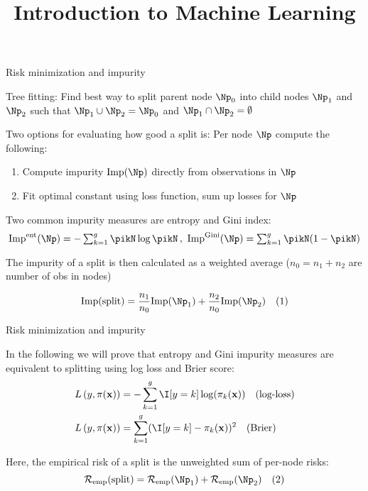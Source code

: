 \documentclass[11pt,compress,t,notes=noshow, xcolor=table]{beamer}
\title{Introduction to Machine Learning}
\begin{document}
    

\begin{framei}[sep=M]{Risk minimization and impurity}

\item Tree fitting: Find best way to split parent node $\Np_0$ into child nodes $\Np_1$ and $\Np_2$ such that $\Np_1 \cup \Np_2 = \Np_0$ and $\Np_1 \cap \Np_2 = \emptyset$
\item Two options for evaluating how good a split is: Per node $\Np$ compute the following:
\begin{enumerate}
\item Compute impurity $\text{Imp}(\Np)$ directly from observations in $\Np$
\item Fit optimal constant using loss function, sum up losses for $\Np$
\end{enumerate}
\item  Two common impurity measures are entropy and Gini index:
$$\text{Imp}^{\text{ent}}(\Np) = -\textstyle\sum_{k = 1}^g \pikN \log \pikN\,,\,\, \text{Imp}^{\text{Gini}}(\Np) = \sum_{k=1}^g \pikN (1-\pikN )$$
\item The impurity of a split is then calculated as a weighted average ($n_0 = n_1 + n_2$ are number of obs in nodes)

$$\text{Imp(split)} = \frac{n_1}{n_0} \text{Imp}(\Np_1) + \frac{n_2}{n_0} \text{Imp}(\Np_2) \quad (1)$$


\end{framei}


\begin{framei}[sep=M]{Risk minimization and impurity}
\item In the following we will prove that entropy and Gini impurity measures are equivalent to splitting using log loss and Brier score:
\begin{align*}
    \Lpixy &= -\sum_{k = 1}^g \I [y=k] \log (\pi_k(\xv)) \quad \text{(log-loss)}\\
    \Lpixy &= \sum_{k = 1}^g (\I [y=k] - \pi_k(\xv))^2 \quad \text{(Brier)}
\end{align*}
\item Here, the empirical risk of a split is the unweighted sum of per-node risks:
$$\riske(\text{split}) = \riske(\Np_1) + \riske(\Np_2) \quad (2)$$

\end{framei}
\end{document}
